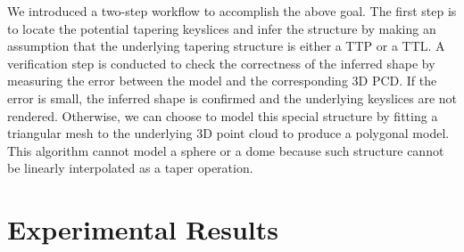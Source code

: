\documentclass[10pt, conference, compsocconf]{IEEEtran}
\newcommand{\Sec}[1]{Sec.~\ref{sec:#1}}
\begin{document}
We introduced a two-step workflow to accomplish the above goal.
The first step is to locate the potential tapering keyslices
and infer the structure by making an assumption that
the underlying tapering structure is either a TTP or a TTL.
A verification step is conducted to check the correctness
of the inferred shape by measuring the error between the model and
the corresponding 3D PCD.
If the error is small, the inferred shape is confirmed
and the underlying keyslices are not rendered.
Otherwise, we can choose to model this special structure by fitting a
triangular mesh to the underlying 3D point cloud to produce a polygonal model.
This algorithm cannot model a sphere or a dome because such structure
cannot be linearly interpolated as a taper operation.

%
%
\section{Experimental Results}
\label{sec:IR_OUT}
\end{document}
